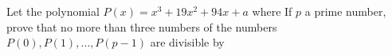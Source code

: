 Let the polynomial $P(x)=x^3+19x^2+94x+a$ where  If $p$ a prime number, prove that no more than  three numbers of the numbers $P(0), P(1),\ldots, P(p-1)$  are divisible by 